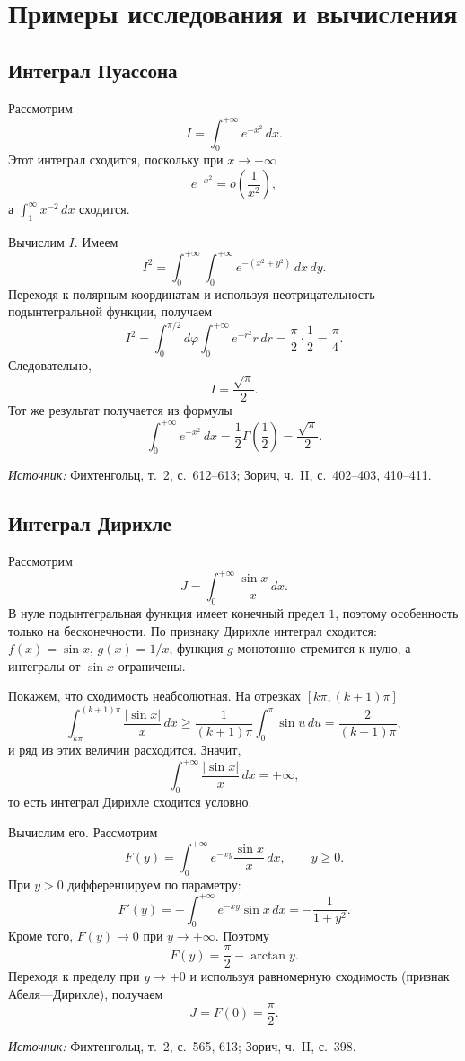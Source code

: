 \documentclass[12pt,a4paper]{article}
\newcommand{\source}[1]{\par\noindent\textit{Источник:} #1.}
\theoremstyle{definition}
\theoremstyle{plain}
\theoremstyle{remark}
\begin{document}
\section{Примеры исследования и вычисления}

\subsection{Интеграл Пуассона}

Рассмотрим
\[
I=\int_0^{+\infty}e^{-x^2}\,dx.
\]
Этот интеграл сходится, поскольку при \(x\to+\infty\)
\[
e^{-x^2}=o\left(\frac1{x^2}\right),
\]
а \(\int_1^\infty x^{-2}\,dx\) сходится.

Вычислим \(I\). Имеем
\[
I^2=\int_0^{+\infty}\int_0^{+\infty}e^{-(x^2+y^2)}\,dx\,dy.
\]
Переходя к полярным координатам и используя неотрицательность подынтегральной функции, получаем
\[
I^2=\int_0^{\pi/2}d\varphi\int_0^{+\infty}e^{-r^2}r\,dr
=
\frac{\pi}{2}\cdot\frac12
=
\frac{\pi}{4}.
\]
Следовательно,
\[
I=\frac{\sqrt{\pi}}{2}.
\]
Тот же результат получается из формулы
\[
\int_0^{+\infty}e^{-x^2}\,dx
=
\frac12\Gamma\left(\frac12\right)
=
\frac{\sqrt{\pi}}{2}.
\]
\source{Фихтенгольц, т.~2, с.~612--613; Зорич, ч.~II, с.~402--403, 410--411}

\subsection{Интеграл Дирихле}

Рассмотрим
\[
J=\int_0^{+\infty}\frac{\sin x}{x}\,dx.
\]
В нуле подынтегральная функция имеет конечный предел \(1\), поэтому особенность только на бесконечности. По признаку Дирихле интеграл сходится: \(f(x)=\sin x\), \(g(x)=1/x\), функция \(g\) монотонно стремится к нулю, а интегралы от \(\sin x\) ограничены.

Покажем, что сходимость неабсолютная. На отрезках \([k\pi,(k+1)\pi]\)
\[
\int_{k\pi}^{(k+1)\pi}\frac{|\sin x|}{x}\,dx
\ge
\frac{1}{(k+1)\pi}\int_0^\pi\sin u\,du
=
\frac{2}{(k+1)\pi},
\]
и ряд из этих величин расходится. Значит,
\[
\int_0^{+\infty}\frac{|\sin x|}{x}\,dx=+\infty,
\]
то есть интеграл Дирихле сходится условно.

Вычислим его. Рассмотрим
\[
F(y)=\int_0^{+\infty}e^{-xy}\frac{\sin x}{x}\,dx,\qquad y\ge0.
\]
При \(y>0\) дифференцируем по параметру:
\[
F'(y)=-\int_0^{+\infty}e^{-xy}\sin x\,dx
=
-\frac{1}{1+y^2}.
\]
Кроме того, \(F(y)\to0\) при \(y\to+\infty\). Поэтому
\[
F(y)=\frac{\pi}{2}-\arctan y.
\]
Переходя к пределу при \(y\to+0\) и используя равномерную сходимость (признак Абеля—Дирихле), получаем
\[
J=F(0)=\frac{\pi}{2}.
\]
\source{Фихтенгольц, т.~2, с.~565, 613; Зорич, ч.~II, с.~398}
\end{document}
